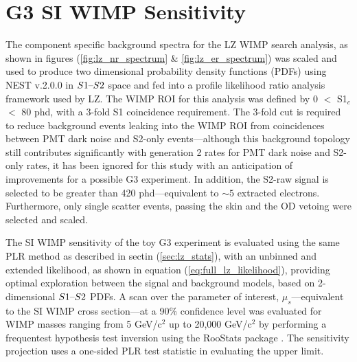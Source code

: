 %

%

\section{G3 SI WIMP Sensitivity}
\label{sec:g3_sensitivity}


The component specific background spectra for the LZ WIMP search analysis, as shown in figures (\ref{fig:lz_nr_spectrum} \& \ref{fig:lz_er_spectrum}) was scaled and used to produce two dimensional probability density functions (PDFs) using NEST v.2.0.0 in $S1\text{--}{}S2$ space and fed into a profile likelihood ratio analysis framework used by LZ. The WIMP ROI for this analysis was defined by 0 $<$ S1$_{c}$ $<$ 80 phd, with a 3-fold S1 coincidence requirement. The 3-fold cut is required to reduce background events leaking into the WIMP ROI from coincidences between PMT dark noise and S2-only events---although this background topology still contributes significantly with generation 2 rates for PMT dark noise and S2-only rates, it has been ignored for this study with an anticipation of improvements for a possible G3 experiment. In addition, the S2-raw signal is selected to be greater than 420 phd---equivalent to $\sim5$ extracted electrons. Furthermore, only single scatter events, passing the skin and the OD vetoing were selected and scaled. 

The SI WIMP sensitivity of the toy G3 experiment is evaluated using the same PLR method as described in sectin (\ref{sec:lz_stats}), with an unbinned and extended likelihood, as shown in equation (\ref{eq:full_lz_likelihood}), providing optimal exploration between the signal and background models, based on 2-dimensional $S1\text{--}{}S2$ PDFs. A scan over the parameter of interest, $\mu_{s}$---equivalent to the SI WIMP cross section---at a 90\% confidence level was evaluated for WIMP masses ranging from 5 GeV/c$^{2}$ up to 20,000 GeV/c$^{2}$ by performing a frequentest hypothesis test inversion using the RooStats package \cite{moneta2010roostats}. The sensitivity projection uses a one-sided PLR test statistic in evaluating the upper limit. 

